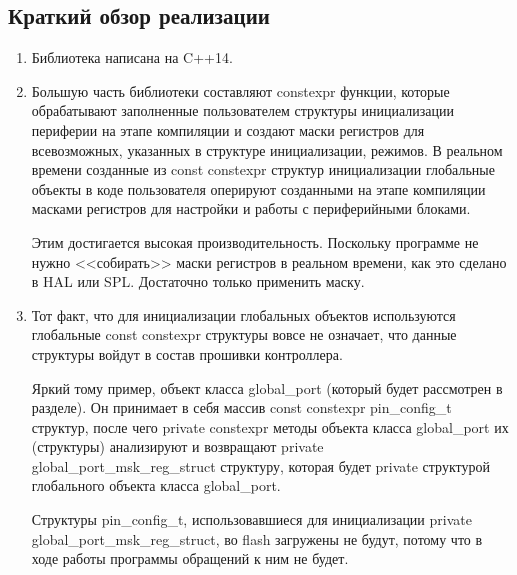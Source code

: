\subsection{Краткий обзор реализации}
\begin{enumerate}
	\item Библиотека написана на C++14. 
	\item Большую часть библиотеки составляют constexpr функции, которые обрабатывают заполненные пользователем структуры инициализации периферии на этапе компиляции и создают маски регистров для всевозможных, указанных в структуре инициализации, режимов. В реальном времени созданные из const constexpr структур инициализации глобальные объекты в коде пользователя оперируют созданными на этапе компиляции масками регистров для настройки и работы с периферийными блоками.
	
	Этим достигается высокая производительность. Поскольку программе не нужно <<собирать>> маски регистров в реальном времени, как это сделано в HAL или SPL. Достаточно только применить маску.
	\item Тот факт, что для инициализации глобальных объектов используются глобальные const constexpr структуры вовсе не означает, что данные структуры войдут в состав прошивки контроллера.
	
	Яркий тому пример, объект класса global\_port (который будет рассмотрен в разделе). Он принимает в себя массив const constexpr pin\_config\_t структур, после чего private constexpr методы объекта класса global\_port их (структуры) анализируют и возвращают private global\_port\_msk\_reg\_struct структуру, которая будет private структурой глобального объекта класса global\_port.
	
	Структуры pin\_config\_t, использовавшиеся для инициализации private global\_port\_msk\_reg\_struct, во flash загружены не будут, потому что в ходе работы программы обращений к ним не будет.
\end{enumerate}